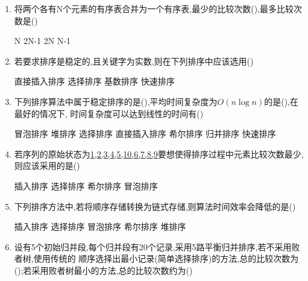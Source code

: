 \documentclass[12pt, a4paper, oneside, UTF8]{ctexbook}
\begin{document}
\begin{enumerate}
    \item 将两个各有N个元素的有序表合并为一个有序表,最少的比较次数(),最多比较次数是() 
    \begin{choices}
        \task N 
        \task 2N-1 
        \task 2N 
        \task N-1 
    \end{choices}
    \item 若要求排序是稳定的,且关键字为实数,则在下列排序中应该选用() 
    \begin{choices}
        \task 直接插入排序
        \task 选择排序
        \task 基数排序
        \task 快速排序 
    \end{choices}
    \item 下列排序算法中属于稳定排序的是(),平均时间复杂度为$O(n\log{n})$的是(),在最好的情况下,
    时间复杂度可以达到线性的时间有() 
    \begin{choices}[4]
        \task 冒泡排序
        \task 堆排序
        \task 选择排序 
        \task 直接插入排序 
        \task 希尔排序 
        \task 归并排序 
        \task 快速排序
    \end{choices}
    \item 若序列的原始状态为\underline{1,2,3,4,5,10,6,7,8,9}要想使得排序过程中元素比较次数最少,则应该采用的是()
    \begin{choices}
        \task 插入排序 
        \task 选择排序 
        \task 希尔排序 
        \task 冒泡排序 
    \end{choices}
    \item \bl 下列排序方法中,若将顺序存储转换为链式存储,则算法时间效率会降低的是() 
    \begin{choices}[3]
        \task 插入排序 
        \task 选择排序
        \task 冒泡排序
        \task 希尔排序 
        \task 堆排序 
    \end{choices}
    \item 设有5个初始归并段,每个归并段有20个记录,采用5路平衡归并排序,若不采用败者树,使用传统的
    顺序选择出最小记录(简单选择排序)的方法,总的比较次数为();若采用败者树最小的方法,总的比较次数约为() 
    \begin{choices}
    \end{choices}


\end{enumerate}
\end{document}

